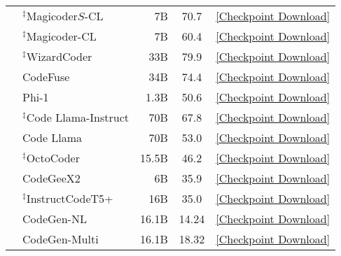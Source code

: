 \begin{table}[t!]
{{\begin{tabular}{clrcc}
         & $^\ddag$Magicoder$S$-CL \cite{wei2023magicoder} & 7B & 70.7 & \href{https://huggingface.co/ise-uiuc/Magicoder-S-CL-7B}{[Checkpoint Download]} \\
         & $^\ddag$Magicoder-CL \cite{wei2023magicoder} & 7B & 60.4 & \href{https://huggingface.co/ise-uiuc/Magicoder-CL-7B}{[Checkpoint Download]}\\
         & $^\ddag$WizardCoder \cite{luo2023wizardcoder} & 33B & 79.9        & \href{https://huggingface.co/WizardLM/WizardCoder-33B-V1.1}{[Checkpoint Download]}  \\
         & CodeFuse \cite{liu2023mftcoder} & 34B & 74.4     & \href{https://huggingface.co/TheBloke/CodeFuse-CodeLlama-34B-GGUF}{[Checkpoint Download]}  \\
         & Phi-1 \cite{gunasekar2023textbooks} & 1.3B & 50.6          & \href{https://huggingface.co/microsoft/phi-1}{[Checkpoint Download]}  \\
         & $^\ddag$Code Llama-Instruct \cite{roziere2023code} & 70B & 67.8 & \href{https://huggingface.co/codellama/CodeLlama-70b-Instruct-hf}{[Checkpoint Download]}  \\
         & Code Llama \cite{roziere2023code} & 70B & 53.0  & \href{https://huggingface.co/codellama/CodeLlama-70b-hf}{[Checkpoint Download]}  \\
         & $^\ddag$OctoCoder \cite{muennighoff2023octopack} & 15.5B & 46.2   & \href{https://huggingface.co/bigcode/octocoder}{[Checkpoint Download]}  \\
         & CodeGeeX2 \cite{zheng2023codegeex} & 6B & 35.9          & \href{https://huggingface.co/THUDM/codegeex2-6b}{[Checkpoint Download]}  \\
         & $^\ddag$InstructCodeT5+ \cite{wang2023codet5+} & 16B & 35.0          & \href{https://huggingface.co/Salesforce/instructcodet5p-16b}{[Checkpoint Download]}  \\
        & CodeGen-NL \cite{nijkamp2022codegen} & 16.1B & 14.24             & \href{https://huggingface.co/Salesforce/codegen-16B-nl}{[Checkpoint Download]}  \\
        & CodeGen-Multi \cite{nijkamp2022codegen} & 16.1B & 18.32        & \href{https://huggingface.co/Salesforce/codegen-16B-multi}{[Checkpoint Download]}  \\

\end{tabular}}}
\end{table}
